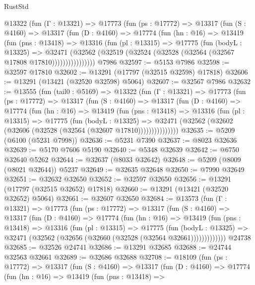 \begin{lexlean}{RustStd}
\begin{coremodule}
      @13322
        (fun (Γ : @13321) =>
        @17773
          (fun (ps : @17772) =>
          @13317
            (fun (S : @4160) =>
            @13317
              (fun (D : @4160) =>
              @17774
                (fun (hn : @16) =>
                @13419
                  (fun (pns : @13418) =>
                  @13316
                    (fun (pl : @13315) =>
                    @17775
                      (fun (bodyL : @13325) =>
                      @32471
                        (@32562
                          (@32519 (@32524 (@32528 (@32564 (@32567 @17808 @17810))))))))))))))))
    @7986
@32597 := @5153 @7986
@32598 := @32597 @17810
@32602 := @13291 (@17797 (@32515 @32598) @17818)
@32606 := @13291 (@13421 (@32520 @32598) @5064)
@32607 := @32567 @7986
@32632 := @13555
    (fun (tail0 : @5169) =>
    @13322
      (fun (Γ : @13321) =>
      @17773
        (fun (ps : @17772) =>
        @13317
          (fun (S : @4160) =>
          @13317
            (fun (D : @4160) =>
            @17774
              (fun (hn : @16) =>
              @13419
                (fun (pns : @13418) =>
                @13316
                  (fun (pl : @13315) =>
                  @17775
                    (fun (bodyL : @13325) =>
                    @32471 (@32562 (@32602 (@32606 (@32528 (@32564 (@32607 @17810)))))))))))))))
@32635 := @5209 (@6100 (@5231 @7998))
@32636 := @5231 @7390
@32637 := @8023 @32636
@32639 := @5170 @7606 @5190
@32640 := @5348 @32639
@32642 := @6750 @32640 @5262
@32644 := @32637 (@8033 @32642)
@32648 := @5209 (@8009 (@8021 @32644)) @5237
@32649 := @32635 @32648
@32650 := @7990 @32649
@32651 := @32632 @32650
@32652 := @32597 @32650
@32656 := @13291 (@17797 (@32515 @32652) @17818)
@32660 := @13291 (@13421 (@32520 @32652) @5064)
@32661 := @32607 @32650
@32684 := @13573
    (fun (Γ : @13321) =>
    @17773
      (fun (ps : @17772) =>
      @13317
        (fun (S : @4160) =>
        @13317
          (fun (D : @4160) =>
          @17774
            (fun (hn : @16) =>
            @13419
              (fun (pns : @13418) =>
              @13316
                (fun (pl : @13315) =>
                @17775
                  (fun (bodyL : @13325) =>
                  @32471 (@32562 (@32656 (@32660 (@32528 (@32564 @32661)))))))))))))
    @24738
@32685 := @32526 @24741
@32686 := @13291 @32685
@32688 := @24744 @32563 @32661
@32689 := @32686 @32688
@32708 := @18109
    (fun (ps : @17772) =>
    @13317
      (fun (S : @4160) =>
      @13317
        (fun (D : @4160) =>
        @17774
          (fun (hn : @16) =>
          @13419
            (fun (pns : @13418) =>

\end{coremodule}
\end{lexlean}
